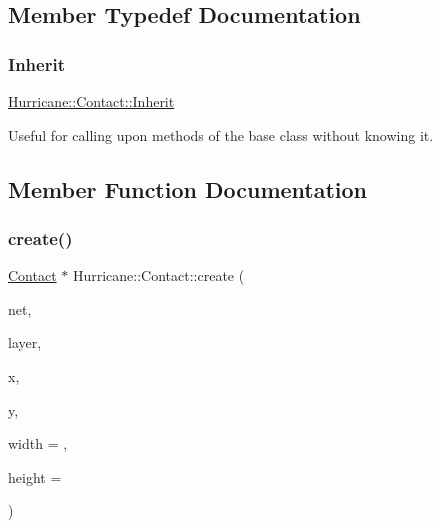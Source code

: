\subsection{Member Typedef Documentation}
\mbox{\label{classHurricane_1_1Contact_a422f15bba0561d8499c001fb8cbe6b67}} 
\subsubsection{\texorpdfstring{Inherit}{Inherit}}
{\footnotesize\ttfamily \mbox{\hyperlink{classHurricane_1_1Contact_a422f15bba0561d8499c001fb8cbe6b67}{Hurricane\+::\+Contact\+::\+Inherit}}}

Useful for calling upon methods of the base class without knowing it. 

\subsection{Member Function Documentation}
\mbox{\label{classHurricane_1_1Contact_a5402fec0518c81d35fbec2c2b2ec0f8f}} 
\subsubsection{\texorpdfstring{create()}{create()}\hspace{0.1cm}{\footnotesize\ttfamily [1/2]}}
{\footnotesize\ttfamily \mbox{\hyperlink{classHurricane_1_1Contact}{Contact}} $\ast$ Hurricane\+::\+Contact\+::create (\begin{DoxyParamCaption}\item[{\mbox{\hyperlink{classHurricane_1_1Net}{Net}} $\ast$}]{net,  }\item[{const \mbox{\hyperlink{classHurricane_1_1Layer}{Layer}} $\ast$}]{layer,  }\item[{const \mbox{\hyperlink{group__DbUGroup_ga4fbfa3e8c89347af76c9628ea06c4146}{Db\+U\+::\+Unit}} \&}]{x,  }\item[{const \mbox{\hyperlink{group__DbUGroup_ga4fbfa3e8c89347af76c9628ea06c4146}{Db\+U\+::\+Unit}} \&}]{y,  }\item[{const \mbox{\hyperlink{group__DbUGroup_ga4fbfa3e8c89347af76c9628ea06c4146}{Db\+U\+::\+Unit}} \&}]{width = {},  }\item[{const \mbox{\hyperlink{group__DbUGroup_ga4fbfa3e8c89347af76c9628ea06c4146}{Db\+U\+::\+Unit}} \&}]{height = {} }\end{DoxyParamCaption})\hspace{0.3cm}{\ttfamily [static]}}

